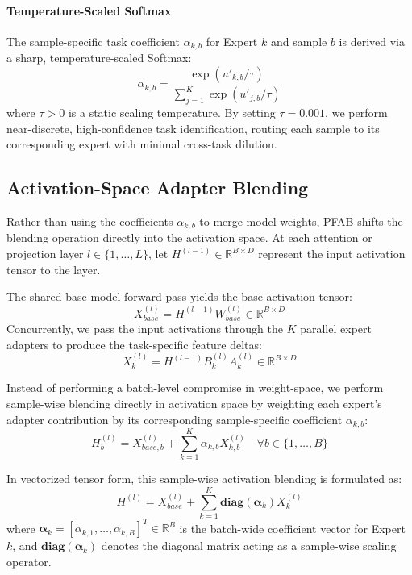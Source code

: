 \paragraph{Temperature-Scaled Softmax}
The sample-specific task coefficient $\alpha_{k, b}$ for Expert $k$ and sample $b$ is derived via a sharp, temperature-scaled Softmax:
\begin{equation}
  \alpha_{k, b} = \frac{\exp(u'_{k, b} / \tau)}{\sum_{j=1}^K \exp(u'_{j, b} / \tau)}
\end{equation}
where $\tau > 0$ is a static scaling temperature. By setting $\tau = 0.001$, we perform near-discrete, high-confidence task identification, routing each sample to its corresponding expert with minimal cross-task dilution.

\subsection{Activation-Space Adapter Blending}
Rather than using the coefficients $\alpha_{k, b}$ to merge model weights, \textsc{PFAB} shifts the blending operation directly into the activation space. At each attention or projection layer $l \in \{1, \dots, L\}$, let $H^{(l-1)} \in \mathbb{R}^{B \times D}$ represent the input activation tensor to the layer.

The shared base model forward pass yields the base activation tensor:
\begin{equation}
  X_{base}^{(l)} = H^{(l-1)} W_{base}^{(l)} \in \mathbb{R}^{B \times D}
\end{equation}
Concurrently, we pass the input activations through the $K$ parallel expert adapters to produce the task-specific feature deltas:
\begin{equation}
  X_k^{(l)} = H^{(l-1)} B_k^{(l)} A_k^{(l)} \in \mathbb{R}^{B \times D}
\end{equation}

Instead of performing a batch-level compromise in weight-space, we perform sample-wise blending directly in activation space by weighting each expert's adapter contribution by its corresponding sample-specific coefficient $\alpha_{k, b}$:
\begin{equation}
  H^{(l)}_b = X_{base, b}^{(l)} + \sum_{k=1}^K \alpha_{k, b} X_{k, b}^{(l)} \quad \forall b \in \{1, \dots, B\}
\end{equation}

In vectorized tensor form, this sample-wise activation blending is formulated as:
\begin{equation}
  H^{(l)} = X_{base}^{(l)} + \sum_{k=1}^K \mathbf{diag}(\boldsymbol{\alpha}_k) X_k^{(l)}
\end{equation}
where $\boldsymbol{\alpha}_k = [\alpha_{k, 1}, \dots, \alpha_{k, B}]^T \in \mathbb{R}^B$ is the batch-wide coefficient vector for Expert $k$, and $\mathbf{diag}(\boldsymbol{\alpha}_k)$ denotes the diagonal matrix acting as a sample-wise scaling operator.

